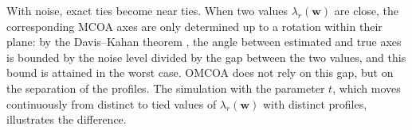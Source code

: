 \begin{remark}
With noise, exact ties become near ties. When two values $\lambda_r(\mathbf w)$
are close, the corresponding MCOA axes are only determined up to a rotation
within their plane: by the Davis--Kahan theorem \cite{davis1970}, the angle
between estimated and true axes is bounded by the noise level divided by the
gap between the two values, and this bound is attained in the worst case.
OMCOA does not rely on this gap, but on the separation of the profiles. The
simulation with the parameter $t$, which moves continuously from distinct to
tied values of $\lambda_r(\mathbf w)$ with distinct profiles, illustrates the
difference.
\end{remark}

